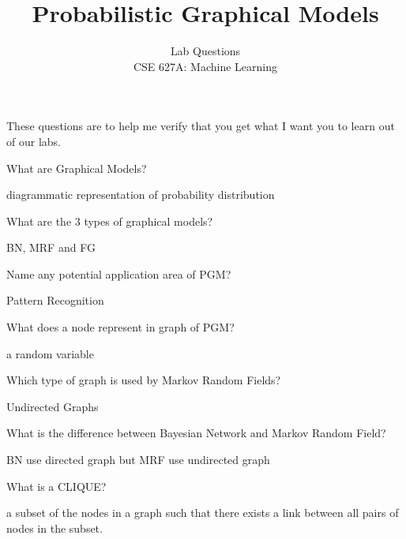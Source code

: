 \documentclass[addpoints]{exam}
\begin{document}
 
\title{Probabilistic Graphical Models}%
\author{Lab Questions\\ %
CSE 627A: Machine Learning} %
\maketitle

\vspace{0.2in}\newline
These questions are to help me verify that you get what I want you to learn out of our labs.
\vspace{0.2in}

\begin{questions}
\question[0]
What are Graphical Models?
\begin{solutionordottedlines}[1in]
diagrammatic representation of probability distribution
\end{solutionordottedlines}

\question[0]
What are the 3 types of graphical models?
\begin{solutionordottedlines}[1in]
BN, MRF and FG
\end{solutionordottedlines}

\question[0]
Name any potential application area of PGM?
\begin{solutionordottedlines}[1in]
Pattern Recognition
\end{solutionordottedlines}

\question[0]
What does a node represent in graph of PGM?
\begin{solutionordottedlines}[1in]
a random variable
\end{solutionordottedlines}

\question[0]
Which type of graph is used by Markov Random Fields?
\begin{solutionordottedlines}[1in]
Undirected Graphs
\end{solutionordottedlines}

\question[0] 
What is the difference between Bayesian Network and Markov Random Field?
\begin{solutionordottedlines}[1in]
BN use directed graph but MRF use undirected graph
\end{solutionordottedlines}

\question[0]
What is a CLIQUE?
\begin{solutionordottedlines}[1in]
a subset of the nodes in a graph such that there exists a link between all pairs of nodes in the subset.
\end{solutionordottedlines}


\end{questions}
\end{document}
